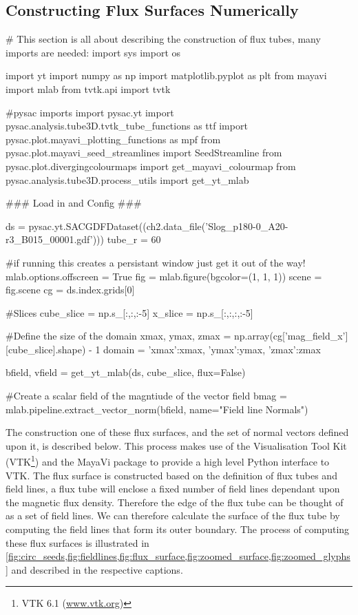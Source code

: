 \subsection{Constructing Flux Surfaces Numerically}
\begin{pycode}[chapter2]
# This section is all about describing the construction of flux tubes, many imports are needed:
import sys
import os

import yt
import numpy as np
import matplotlib.pyplot as plt
from mayavi import mlab
from tvtk.api import tvtk

#pysac imports
import pysac.yt
import pysac.analysis.tube3D.tvtk_tube_functions as ttf
import pysac.plot.mayavi_plotting_functions as mpf
from pysac.plot.mayavi_seed_streamlines import SeedStreamline
from pysac.plot.divergingcolourmaps import get_mayavi_colourmap
from pysac.analysis.tube3D.process_utils import get_yt_mlab

### Load in and Config ###

ds = pysac.yt.SACGDFDataset((ch2.data_file('Slog_p180-0_A20-r3_B015_00001.gdf')))
tube_r = 60

#if running this creates a persistant window just get it out of the way!
mlab.options.offscreen = True
fig = mlab.figure(bgcolor=(1, 1, 1))
scene = fig.scene
cg = ds.index.grids[0]

#Slices
cube_slice = np.s_[:,:,:-5]
x_slice = np.s_[:,:,:,:-5]

#Define the size of the domain
xmax, ymax, zmax = np.array(cg['mag_field_x'][cube_slice].shape) - 1
domain = {'xmax':xmax, 'ymax':ymax, 'zmax':zmax}

bfield, vfield = get_yt_mlab(ds, cube_slice, flux=False)

#Create a scalar field of the magntiude of the vector field
bmag = mlab.pipeline.extract_vector_norm(bfield, name="Field line Normals")
\end{pycode}

The construction one of these flux surfaces, and the set of normal vectors defined upon it, is described below.
This process makes use of the Visualisation Tool Kit (VTK\footnote{VTK 6.1 (\url{www.vtk.org})}) and the MayaVi package \cite{Ramachandran2011} to provide a high level Python interface to VTK.
The flux surface is constructed based on the definition of flux tubes and field lines, a flux tube will enclose a fixed number of field lines dependant upon the magnetic flux density.
Therefore the edge of the flux tube can be thought of as a set of field lines.
We can therefore calculate the surface of the flux tube by computing the field lines that form its outer boundary.
The process of computing these flux surfaces is illustrated in \cref{fig:circ_seeds,fig:fieldlines,fig:flux_surface,fig:zoomed_surface,fig:zoomed_glyphs} and described in the respective captions.

